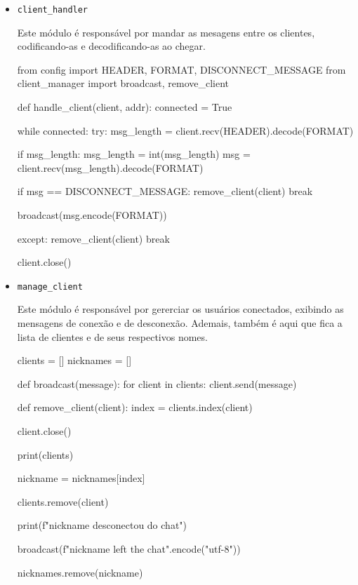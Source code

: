 	
	\begin{itemize}
		\item \texttt{client\_handler}
		
		Este módulo é responsável por mandar as mesagens entre os clientes, codificando-as e decodificando-as ao chegar.
		
		\begin{pycode}
			from config import HEADER, FORMAT, DISCONNECT_MESSAGE
			from client_manager import broadcast, remove_client
			
			
			def handle_client(client, addr):
			connected = True
			
			while connected:
			try:
			msg_length = client.recv(HEADER).decode(FORMAT)
			
			if msg_length:
			msg_length = int(msg_length)
			msg = client.recv(msg_length).decode(FORMAT)
			
			if msg == DISCONNECT_MESSAGE:
			remove_client(client)
			break
			
			broadcast(msg.encode(FORMAT))
			
			except:
			remove_client(client)
			break
			
			client.close()
		\end{pycode}	
		
		\item \texttt{manage\_client}
		
		Este módulo é responsável por gererciar os usuários conectados, exibindo as mensagens de conexão e de desconexão. Ademais, também é aqui que fica a lista de clientes e de seus respectivos nomes.
		
		\begin{pycode}
			clients = []
			nicknames = []
			
			
			def broadcast(message):
			for client in clients:
			client.send(message)
			
			
			def remove_client(client):
			index = clients.index(client)
			
			client.close()
			
			print(clients)
			
			nickname = nicknames[index]
			
			clients.remove(client)
			
			print(f"{nickname} desconectou do chat")
			
			broadcast(f"{nickname} left the chat".encode("utf-8"))
			
			nicknames.remove(nickname)
		\end{pycode}
		

\end{itemize}
